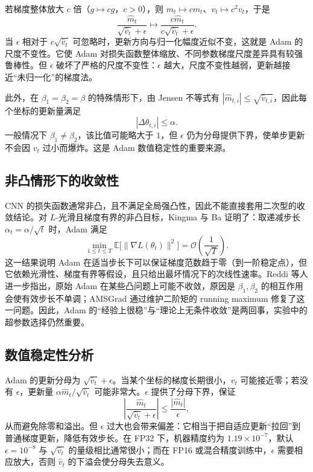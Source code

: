 \documentclass[12pt,a4paper]{ctexart}
\begin{document}
若梯度整体放大 $c$ 倍（$g\mapsto cg$，$c>0$），则 $m_t\mapsto cm_t$、$v_t\mapsto c^2v_t$，于是
\begin{equation}
\frac{\hat m_t}{\sqrt{\hat v_t}+\epsilon}
\longmapsto
\frac{c\hat m_t}{c\sqrt{\hat v_t}+\epsilon}.
\end{equation}
当 $\epsilon$ 相对于 $c\sqrt{\hat v_t}$ 可忽略时，更新方向与归一化幅度近似不变，这就是 Adam 的尺度不变性。它使 Adam 对损失函数整体缩放、不同参数梯度尺度差异具有较强鲁棒性。但 $\epsilon$ 破坏了严格的尺度不变性：$\epsilon$ 越大，尺度不变性越弱，更新越接近“未归一化”的梯度法。

此外，在 $\beta_1=\beta_2=\beta$ 的特殊情形下，由 Jensen 不等式有 $|\hat m_{t,i}|\le\sqrt{\hat v_{t,i}}$，因此每个坐标的更新量满足
\begin{equation}
|\Delta\theta_{t,i}|\le\alpha.
\end{equation}
一般情况下 $\beta_1\ne\beta_2$，该比值可能略大于 $1$，但 $\epsilon$ 仍为分母提供下界，使单步更新不会因 $v_t$ 过小而爆炸。这是 Adam 数值稳定性的重要来源。

\subsection{非凸情形下的收敛性}
CNN 的损失函数通常非凸，且不满足全局强凸性，因此不能直接套用二次型的收敛结论。对 $L$-光滑且梯度有界的非凸目标，Kingma 与 Ba 证明了：取递减步长 $\alpha_t=\alpha/\sqrt{t}$ 时，Adam 满足
\begin{equation}
\min_{1\le t\le T}\mathbb E\bigl[\|\nabla L(\theta_t)\|^2\bigr]
=\mathcal O\left(\frac{1}{\sqrt T}\right).
\end{equation}
这一结果说明 Adam 在适当步长下可以保证梯度范数趋于零（到一阶稳定点），但它依赖光滑性、梯度有界等假设，且只给出最坏情况下的次线性速率。Reddi 等人进一步指出，原始 Adam 在某些凸问题上可能不收敛，原因是 $\beta_1,\beta_2$ 的相互作用会使有效步长不单调；AMSGrad 通过维护二阶矩的 running maximum 修复了这一问题。因此，Adam 的“经验上很稳”与“理论上无条件收敛”是两回事，实验中的超参数选择仍然重要。

\subsection{数值稳定性分析}
Adam 的更新分母为 $\sqrt{\hat v_t}+\epsilon$。当某个坐标的梯度长期很小，$\hat v_t$ 可能接近零；若没有 $\epsilon$，更新量 $\alpha\hat m_t/\sqrt{\hat v_t}$ 可能非常大。$\epsilon$ 提供了分母下界，保证
\begin{equation}
\left|\frac{\hat m_t}{\sqrt{\hat v_t}+\epsilon}\right|\le \frac{|\hat m_t|}{\epsilon},
\end{equation}
从而避免除零和溢出。但 $\epsilon$ 过大也会带来偏差：它相当于把自适应更新“拉回”到普通梯度更新，降低有效步长。在 FP32 下，机器精度约为 $1.19\times10^{-7}$，默认 $\epsilon=10^{-8}$ 与 $\sqrt{\hat v_t}$ 的量级相比通常很小；而在 FP16 或混合精度训练中，$\epsilon$ 需要相应放大，否则 $\hat v_t$ 的下溢会使分母失去意义。
\end{document}
